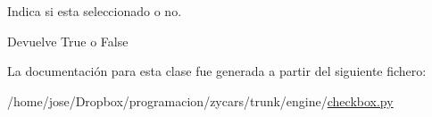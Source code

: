 \-Indica si esta seleccionado o no. 

\begin{DoxyReturn}{\-Devuelve}
\-True o \-False 
\end{DoxyReturn}


\-La documentación para esta clase fue generada a partir del siguiente fichero\-:\begin{DoxyCompactItemize}
\item 
/home/jose/\-Dropbox/programacion/zycars/trunk/engine/\hyperlink{checkbox_8py}{checkbox.\-py}\end{DoxyCompactItemize}
